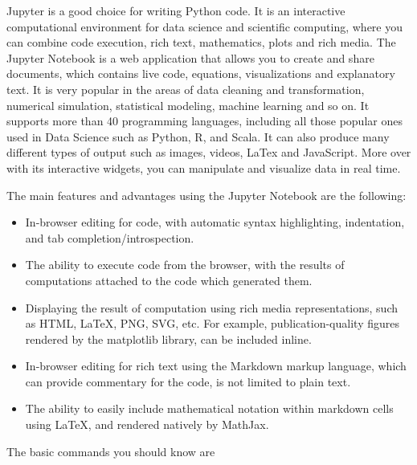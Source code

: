 Jupyter is a good choice for writing Python code. It is an interactive computational environment for data science and scientific computing, where you can combine code execution, rich text, mathematics, plots and rich media. The Jupyter Notebook is a web application that allows you to create and share documents, which contains live code, equations, visualizations and explanatory text. It is very popular in the areas of data cleaning and transformation, numerical simulation, statistical modeling, machine learning and so on. It supports more than 40 programming languages, including all those popular ones used in Data Science such as Python, R, and Scala. It can also produce many different types of output such as images, videos, LaTex and JavaScript. More over with its interactive widgets, you can manipulate and visualize data in real time.

\noindent The main features and advantages using the Jupyter Notebook are the
following:

\begin{itemize}

\item In-browser editing for code, with automatic syntax highlighting, indentation, and tab completion/introspection.

\item The ability to execute code from the browser, with the results of computations attached to the code which generated them.

\item Displaying the result of computation using rich media representations, such as HTML, LaTeX, PNG, SVG, etc. For example, publication-quality figures rendered by the matplotlib library, can be included inline.

\item In-browser editing for rich text using the Markdown markup language, which can provide commentary for the code, is not limited to plain text.

\item The ability to easily include mathematical notation within markdown cells using LaTeX, and rendered natively by MathJax.

\end{itemize}

\noindent The basic commands you should know are
\clearpage

